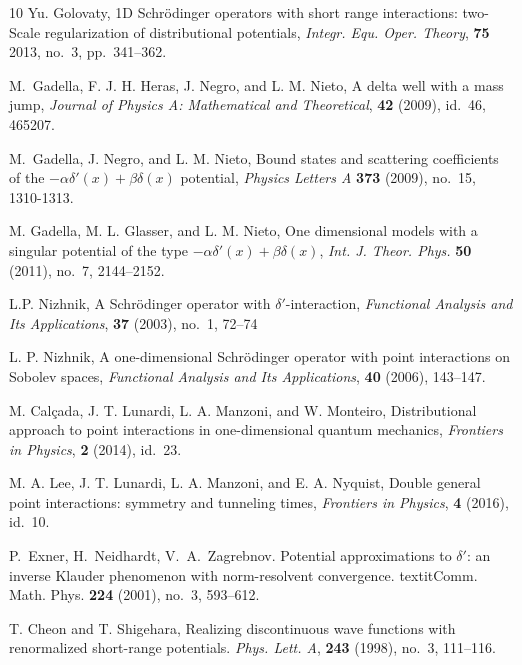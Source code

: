 \documentclass[reqno]{amsart}
\theoremstyle{definition}
\theoremstyle{remark}
\numberwithin{equation}{section}
\begin{document}
\begin{thebibliography}{10}
    Yu. Golovaty,
    1D Schr\"odinger operators with short range interactions: two-Scale regularization of distributional potentials,
    \textit{Integr. Equ. Oper. Theory}, \textbf{75} 2013, no.~3, pp.~341--362.

    M.~Gadella, F. J. H. Heras, J. Negro, and L. M. Nieto,
    A delta well with a mass jump,
    \textit{Journal of Physics A: Mathematical and Theoretical}, \textbf{42} (2009), id.~46, 465207.

    M.~Gadella, J. Negro, and L. M. Nieto,
    Bound states and scattering coefficients of the $-\alpha\delta'(x)+ \beta\delta(x)$ potential,
    \textit{Physics Letters A} \textbf{373} (2009), no.~15, 1310-1313.

    M. Gadella, M. L. Glasser, and L. M. Nieto,
    One dimensional models with a singular potential of the type $-\alpha\delta'(x)+ \beta\delta(x)$,
    \textit{Int. J. Theor. Phys.} \textbf{50} (2011), no.~7, 2144--2152.

     L.P. Nizhnik,
     A Schr\"odinger operator with $\delta'$-interaction,
     \textit{Functional Analysis and Its Applications}, \textbf{37} (2003), no.~1, 72--74

    L. P. Nizhnik,
    A one-dimensional Schr\"odinger operator with point interactions on Sobolev spaces,
    \textit{Functional Analysis and Its Applications}, \textbf{40} (2006), 143--147.

    M. Cal\c{c}ada,  J. T. Lunardi, L. A. Manzoni, and W. Monteiro,
    Distributional approach to point interactions in one-dimensional quantum mechanics,
    \textit{Frontiers in Physics}, \textbf{2} (2014), id.~23.

    M. A. Lee,  J. T. Lunardi,  L. A. Manzoni,  and  E. A. Nyquist,
    Double general point interactions: symmetry and tunneling times,
    \textit{Frontiers in Physics}, \textbf{4} (2016), id.~10.

    P.~Exner, H.~Neidhardt, V.~A.~Zagrebnov.
    Potential approximations to $\delta'$: an inverse Klauder phenomenon with norm-resolvent convergence.
    textit{Comm. Math. Phys.}  \textbf{224} (2001), no.~3, 593--612.

    T. Cheon and T. Shigehara,
    Realizing discontinuous wave functions with renormalized short-range potentials.
    \textit{Phys. Lett. A}, \textbf{243} (1998), no.~3, 111--116.


\end{thebibliography}
\end{document}
